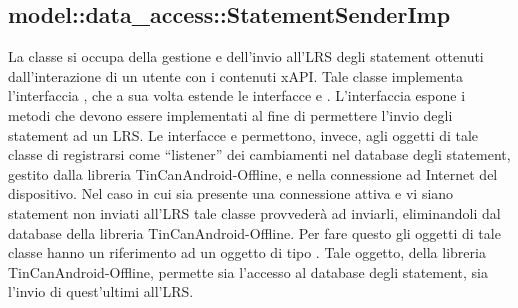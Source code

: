 \documentclass[../Tesi.tex]{subfiles}
\begin{document}
		\subsection{model::data\_access::StatementSenderImp}
		La classe  si occupa della gestione e dell'invio all'LRS degli statement ottenuti dall'interazione di un utente con i contenuti xAPI. Tale classe implementa l'interfaccia , che a sua volta estende le interfacce  e . L'interfaccia  espone i metodi che devono essere implementati al fine di permettere l'invio degli statement ad un LRS. Le interfacce  e  permettono, invece, agli oggetti di tale classe di registrarsi come ``listener'' dei cambiamenti nel database degli statement, gestito dalla libreria TinCanAndroid-Offline, e nella connessione ad Internet del dispositivo. Nel caso in cui sia presente una connessione attiva e vi siano statement non inviati all'LRS tale classe provvederà ad inviarli, eliminandoli dal database della libreria TinCanAndroid-Offline. Per fare questo gli oggetti di tale classe hanno un riferimento ad un oggetto di tipo . Tale oggetto, della libreria TinCanAndroid-Offline, permette sia l'accesso al database degli statement, sia l'invio di quest'ultimi all'LRS.
\end{document}
